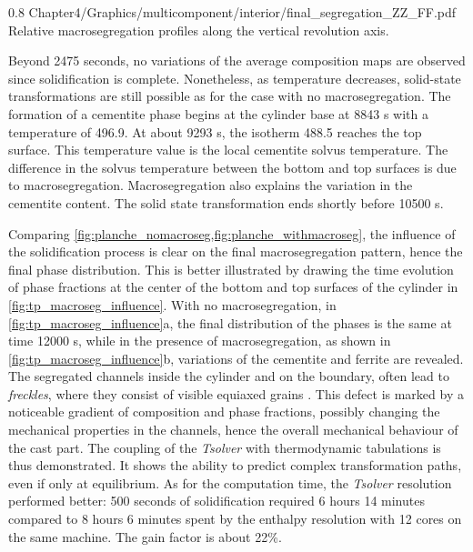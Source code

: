 \begin{figureth}
{0.8}
{Chapter4/Graphics/multicomponent/interior/final_segregation_ZZ_FF.pdf}
{Relative macrosegregation profiles along the vertical revolution axis.}
\label{fig:segregation_profile_ZZ}
\end{figureth}

Beyond \num{2475} seconds, no variations of the average composition maps are observed since solidification is complete. 
Nonetheless, as temperature decreases, solid-state transformations are 
still possible as for the case with no macrosegregation. The formation of a cementite phase begins at the 
cylinder base at \num{8843} s with a temperature of \SI{496.9}{\udegC}. At about \num{9293} s, the isotherm \SI{488.5}{\udegC} reaches the 
top surface. This temperature value is the local cementite solvus temperature. The difference in the solvus 
temperature between the bottom and top surfaces is due to macrosegregation. Macrosegregation also explains the 
variation in the cementite content. The solid state transformation ends shortly before \num{10500} s. 

Comparing \cref{fig:planche_nomacroseg,fig:planche_withmacroseg}, the influence of the solidification process is clear on 
the final macrosegregation pattern, hence the final phase distribution. This is better illustrated by drawing the time evolution of phase fractions at the 
center of the bottom and top surfaces of the cylinder in \cref{fig:tp_macroseg_influence}. With no macrosegregation, in 
\cref{fig:tp_macroseg_influence}a, the final distribution of the phases is the same at time \num{12000} s, while in
the presence of macrosegregation, 
as shown in \cref{fig:tp_macroseg_influence}b, variations of the cementite and ferrite are revealed. 
The segregated channels inside the cylinder and on the boundary, often lead to \emph{freckles}, 
where they consist of visible equiaxed grains \citep{copley_origin_1970}.
This defect is marked by a noticeable gradient of composition and phase fractions, possibly changing the mechanical 
properties in the channels, hence the overall mechanical behaviour of the cast part. The coupling of the \emph{Tsolver} with 
thermodynamic tabulations is thus demonstrated. It shows the ability to predict complex transformation paths, even if 
only at equilibrium. As for the computation time, the \emph{Tsolver} resolution performed better: 500 seconds of solidification 
required 6 hours 14 minutes compared to 8 hours 6 minutes spent by the enthalpy resolution with 12 cores on the same machine. 
The gain factor is about 22\%.

